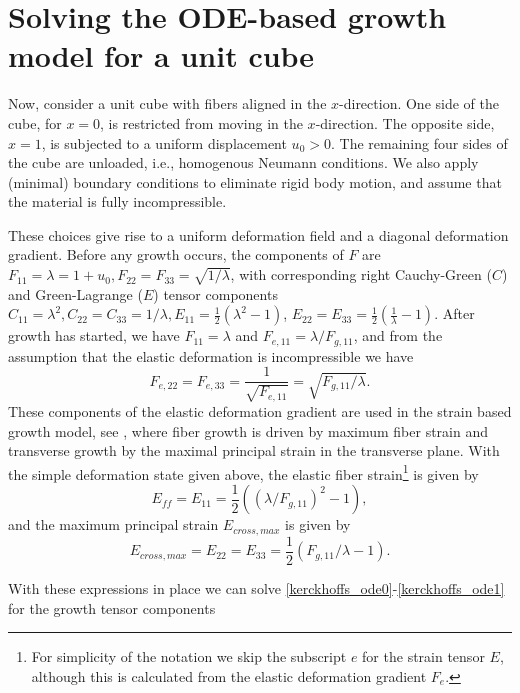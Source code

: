 \documentclass[a4paper,10pt]{article}
\begin{document}
\section{Solving the ODE-based growth model for a unit cube}
Now, consider a unit cube with fibers aligned in the $x$-direction. One side of the cube, for $x=0$, is 
restricted from moving in the $x$-direction. The opposite side, $x=1$, is subjected to a uniform
displacement $u_0 > 0$. The remaining four sides of the cube are unloaded, i.e., homogenous 
Neumann conditions. We also apply (minimal) boundary conditions to eliminate rigid body motion, and assume
that the material is fully incompressible. 

These choices give rise to a uniform deformation field and a diagonal deformation 
gradient. Before any growth occurs, the components of $F$ are $F_{11} = \lambda = 1+u_0, F_{22}=F_{33} = \sqrt{1/\lambda}$,
with corresponding right Cauchy-Green ($C$) and Green-Lagrange ($E$) tensor components 
$C_{11} = \lambda^2 ,C_{22} =C_{33} = 1/\lambda, E_{11} = \frac{1}{2}(\lambda^2 - 1)$,
$E_{22} = E_{33} = \frac{1}{2}(\frac{1}{\lambda}-1).$ After growth has started, we have
$F_{11} = \lambda$ and $F_{e,11} = \lambda / F_{g,11}$, and from the assumption that the
elastic deformation is incompressible we have 
\[
F_{e,22} = F_{e,33} = \frac{1}{\sqrt{F_{e,11}}} = \sqrt{F_{g,11}/ \lambda} .
\]
These components of the elastic deformation gradient are used in the strain based growth model, see 
\cite{Kerckhoffs2012MRC}, where fiber growth is driven by maximum fiber strain and transverse growth
by the maximal principal strain in the transverse plane. With the simple 
deformation state given above, the elastic fiber strain\footnote{For simplicity of the notation we skip the subscript $e$ for the strain tensor $E$, although this is
calculated from the elastic deformation gradient $F_e$.} 
is given by
\[
  E_{ff} = E_{11} = \frac{1}{2}((\lambda/F_{g,11})^2 - 1),
\]
and the maximum principal strain $E_{cross,max}$
is given by
\[
  E_{cross,max} = E_{22} = E_{33} =  \frac{1}{2}(F_{g,11}/ \lambda-1).
\]

With these expressions in place we can solve \eqref{kerckhoffs_ode0}-\eqref{kerckhoffs_ode1} for the
growth tensor components 




\end{document}
